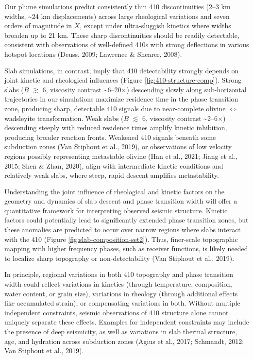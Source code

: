 \documentclass[draft,linenumbers]{agujournal2019}
\begin{document}
Our plume simulations predict consistently thin 410 discontinuities
(2--3 km widths, \textasciitilde24 km displacements) across large
rheological variations and seven orders of magnitude in \(\dot{X}\),
except under ultra-sluggish kinetics where widths broaden up to 21 km.
These sharp discontinuities should be readily detectable, consistent
with observations of well-defined 410s with strong deflections in
various hotspot locations (Deuss, 2009; Lawrence \& Shearer, 2008).

Slab simulations, in contrast, imply that 410 detectability strongly
depends on joint kinetic and rheological influences (Figure
\ref{fig:410-structure-comp}). Strong slabs (\(B\) \(\gtrsim\) 6,
viscosity contrast \textasciitilde6--20\(\times\)) descending slowly
along sub-horizontal trajectories in our simulations maximize residence
time in the phase transition zone, producing sharp, detectable 410
signals due to near-complete olivine \(\Leftrightarrow\) wadsleyite
transformation. Weak slabs (\(B\) \(\lesssim\) 6, viscosity contrast
\textasciitilde2--6\(\times\)) descending steeply with reduced residence
times amplify kinetic inhibition, producing broader reaction fronts.
Weakened 410 signals beneath some subduction zones (Van Stiphout et al.,
2019), or observations of low velocity regions possibly representing
metastable olivine (Han et al., 2021; Jiang et al., 2015; Shen \& Zhan,
2020), align with intermediate kinetic conditions and relatively weak
slabs, where steep, rapid descent amplifies metastability.

Understanding the joint influence of rheological and kinetic factors on
the geometry and dynamics of slab descent and phase transition width
will offer a quantitative framework for interpreting observed seismic
structure. Kinetic factors could potentially lead to significantly
extended phase transition zones, but these anomalies are predicted to
occur over narrow regions where slabs interact with the 410 (Figure
\ref{fig:slab-composition-set2}). Thus, finer-scale topographic mapping
with higher frequency phases, such as receiver functions, is likely
needed to localize sharp topography or non-detectability (Van Stiphout
et al., 2019).

In principle, regional variations in both 410 topography and phase
transition width could reflect variations in kinetics (through
temperature, composition, water content, or grain size), variations in
rheology (through additional effects like accumulated strain), or
compensating variations in both. Without multiple independent
constraints, seismic observations of 410 structure alone cannot uniquely
separate these effects. Examples for independent constraints may include
the presence of deep seismicity, as well as variations in slab thermal
structure, age, and hydration across subduction zones (Agius et al.,
2017; Schmandt, 2012; Van Stiphout et al., 2019).
\end{document}
